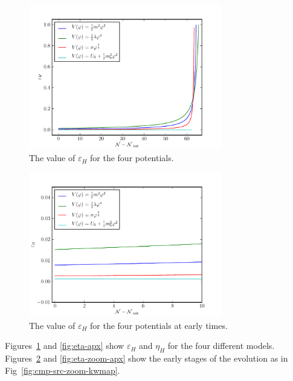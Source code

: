 \begin{figure}
 \centering
 \includegraphics[width=0.75\textwidth]{numerical/graphs/epsilon_slowroll-large.pdf}
 \caption[Value of $\varepsilon_H$ for the Four Potentials]{The value of $\varepsilon_H$ for
the four potentials.}
 \label{fig:eps-apx}
\end{figure}

\begin{figure}
 \centering
 \includegraphics[width=0.75\textwidth]{numerical/graphs/epsilon_slowroll_zoom-large.pdf}
 \caption[Value of $\varepsilon_H$ for the Four Potentials at Early Times]{The value of
$\varepsilon_H$ for the four potentials at early times.}
 \label{fig:eps-zoom-apx}
\end{figure}

Figures~\ref{fig:eps-apx} and \ref{fig:eta-apx} show $\varepsilon_H$ and $\eta_H$ for the
four different models. Figures~\ref{fig:eps-zoom-apx} and
\ref{fig:eta-zoom-apx} show the early stages of the evolution as in
Fig~\ref{fig:cmp-src-zoom-kwmap}.

